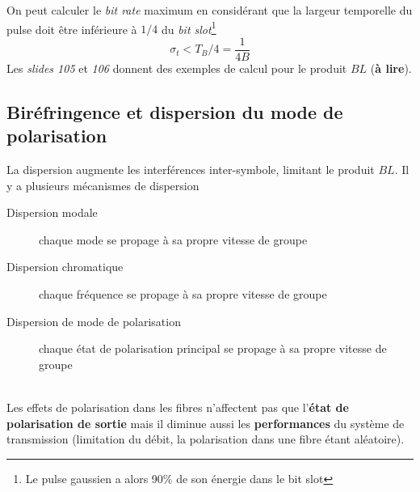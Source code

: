 	On peut calculer le \textit{bit rate} maximum en considérant que la largeur temporelle du 
	pulse doit être inférieure à $1/4$ du \textit{bit slot}\footnote{Le pulse gaussien a alors
	90\% de son énergie dans le bit slot}
	\begin{equation}
	\sigma_t < T_B/4 = \frac{1}{4B}
	\end{equation}
	Les \textit{slides 105} et \textit{106} donnent des exemples de calcul pour le produit $BL$ 
	(\textbf{à lire}).
	
	
	\subsection{Biréfringence et dispersion du mode de polarisation}
	La dispersion augmente les interférences inter-symbole, limitant le produit $BL$. Il y a 
	plusieurs mécanismes de dispersion
	\begin{description}
	\item[Dispersion modale] chaque mode se propage à sa propre vitesse de groupe
	\item[Dispersion chromatique] chaque fréquence se propage à sa propre vitesse de groupe
	\item[Dispersion de mode de polarisation] chaque état de polarisation principal se propage à
	sa propre vitesse de groupe
	\end{description}\ \\
	
	Les effets de polarisation dans les fibres n'affectent pas que l'\textbf{état de polarisation
	de sortie} mais il diminue aussi les \textbf{performances} du système de transmission (limitation
	du débit, la polarisation dans une fibre étant aléatoire).
	
